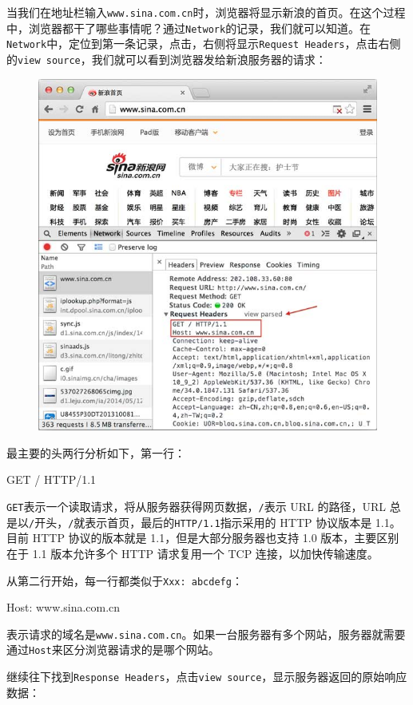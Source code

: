 当我们在地址栏输入\texttt{www.sina.com.cn}时，浏览器将显示新浪的首页。在这个过程中，浏览器都干了哪些事情呢？通过\texttt{Network}的记录，我们就可以知道。在\texttt{Network}中，定位到第一条记录，点击，右侧将显示\texttt{Request\ Headers}，点击右侧的\texttt{view\ source}，我们就可以看到浏览器发给新浪服务器的请求：

 
 \begin{figure}[htp]
	\centering
	\includegraphics[width=0.6\linewidth]{fig/950413532592512.png}
\end{figure}


最主要的头两行分析如下，第一行：

\begin{pythoncode}
GET / HTTP/1.1
\end{pythoncode}

\texttt{GET}表示一个读取请求，将从服务器获得网页数据，\texttt{/}表示 URL
的路径，URL
总是以\texttt{/}开头，\texttt{/}就表示首页，最后的\texttt{HTTP/1.1}指示采用的
HTTP 协议版本是 1.1。目前 HTTP 协议的版本就是
1.1，但是大部分服务器也支持 1.0 版本，主要区别在于 1.1 版本允许多个 HTTP
请求复用一个 TCP 连接，以加快传输速度。

从第二行开始，每一行都类似于\texttt{Xxx:\ abcdefg}：

\begin{pythoncode}
Host: www.sina.com.cn
\end{pythoncode}

表示请求的域名是\texttt{www.sina.com.cn}。如果一台服务器有多个网站，服务器就需要通过\texttt{Host}来区分浏览器请求的是哪个网站。

继续往下找到\texttt{Response\ Headers}，点击\texttt{view\ source}，显示服务器返回的原始响应数据：

